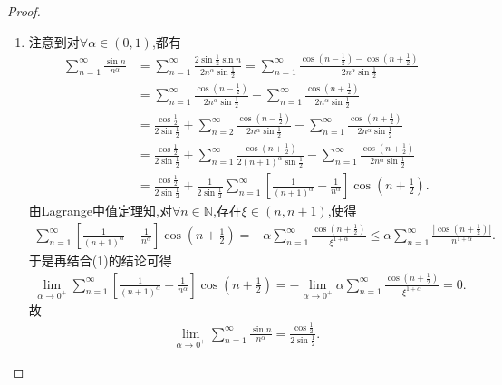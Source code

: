 \documentclass[../../main.tex]{subfiles}%
\begin{document}
\begin{proof}
\begin{enumerate}[(1)]
\item 注意到对$\forall \alpha \in \left( 0,1 \right)$,都有
\begin{align*}
\sum\limits_{n=1}^{\infty} \frac{\sin n}{n^{\alpha}}&=\sum\limits_{n=1}^{\infty} \frac{2\sin \frac{1}{2}\sin n}{2n^{\alpha}\sin \frac{1}{2}}=\sum\limits_{n=1}^{\infty} \frac{\cos \left( n-\frac{1}{2} \right) -\cos \left( n+\frac{1}{2} \right)}{2n^{\alpha}\sin \frac{1}{2}}\\
&=\sum\limits_{n=1}^{\infty} \frac{\cos \left( n-\frac{1}{2} \right)}{2n^{\alpha}\sin \frac{1}{2}}-\sum\limits_{n=1}^{\infty} \frac{\cos \left( n+\frac{1}{2} \right)}{2n^{\alpha}\sin \frac{1}{2}}\\
&=\frac{\cos \frac{1}{2}}{2\sin \frac{1}{2}}+\sum\limits_{n=2}^{\infty} \frac{\cos \left( n-\frac{1}{2} \right)}{2n^{\alpha}\sin \frac{1}{2}}-\sum\limits_{n=1}^{\infty} \frac{\cos \left( n+\frac{1}{2} \right)}{2n^{\alpha}\sin \frac{1}{2}}\\
&=\frac{\cos \frac{1}{2}}{2\sin \frac{1}{2}}+\sum\limits_{n=1}^{\infty} \frac{\cos \left( n+\frac{1}{2} \right)}{2\left( n+1 \right) ^{\alpha}\sin \frac{1}{2}}-\sum\limits_{n=1}^{\infty} \frac{\cos \left( n+\frac{1}{2} \right)}{2n^{\alpha}\sin \frac{1}{2}}\\
&=\frac{\cos \frac{1}{2}}{2\sin \frac{1}{2}}+\frac{1}{2\sin \frac{1}{2}}\sum\limits_{n=1}^{\infty} \left[ \frac{1}{\left( n+1 \right) ^{\alpha}}-\frac{1}{n^{\alpha}} \right] \cos \left( n+\frac{1}{2} \right).
\end{align*}
由Lagrange中值定理知,对$\forall n\in \mathbb{N}$,存在$\xi \in \left( n,n+1 \right)$,使得
\begin{align*}
\sum\limits_{n=1}^{\infty} \left[ \frac{1}{\left( n+1 \right) ^{\alpha}}-\frac{1}{n^{\alpha}} \right] \cos \left( n+\frac{1}{2} \right)=-\alpha \sum\limits_{n=1}^{\infty} \frac{\cos \left( n+\frac{1}{2} \right)}{\xi ^{1+\alpha}} \leqslant \alpha \sum\limits_{n=1}^{\infty} \frac{|\cos \left( n+\frac{1}{2} \right)|}{n^{1+\alpha}}.
\end{align*}
于是再结合(1)的结论可得
\begin{align*}
\lim_{\alpha \rightarrow 0^+} \sum\limits_{n=1}^{\infty} \left[ \frac{1}{\left( n+1 \right) ^{\alpha}}-\frac{1}{n^{\alpha}} \right] \cos \left( n+\frac{1}{2} \right)=-\lim_{\alpha \rightarrow 0^+} \alpha \sum\limits_{n=1}^{\infty} \frac{\cos \left( n+\frac{1}{2} \right)}{\xi ^{1+\alpha}}=0.
\end{align*}
故
\begin{align*}
\lim_{\alpha \rightarrow 0^+} \sum\limits_{n=1}^{\infty} \frac{\sin n}{n^{\alpha}}=\frac{\cos \frac{1}{2}}{2\sin \frac{1}{2}}.
\end{align*}
\end{enumerate}
\end{proof}
\end{document}
